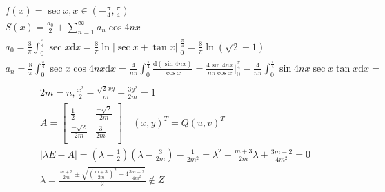 \documentclass{article}
\begin{document}
\begin{align*}
    f(x) = \sec x , x \in (-\frac{\pi}{4},\frac{\pi}{4}) \\
    S(x) = \frac{a_{0}}{2} + \sum_{n=1}^{\infty}a_{n}\cos 4nx \\
    a_{0} = \frac{8}{\pi}\int_{0}^{\frac{\pi}{4}} \sec x \mathrm{d}x = \frac{8}{\pi}\ln|\sec x + \tan x| |_{0}^{\frac{\pi}{4}} = \frac{8}{\pi}\ln(\sqrt{2}+1) \\ 
    a_{n} = \frac{8}{\pi}\int_{0}^{\frac{\pi}{4}} \sec x \cos 4nx \mathrm{d}x = \frac{4}{n\pi}\int_{0}^{\frac{\pi}{4}} \frac{\mathrm{d}(\sin 4nx)}{\cos x} = \frac{4\sin 4nx}{n\pi\cos x} |_{0}^{\frac{\pi}{4}} - \frac{4}{n\pi}\int_{0}^{\frac{\pi}{4}}\sin 4nx \sec x \tan x \mathrm{d}x  = \\
   \end{align*}
\begin{align*}
    2m = n , \frac{x^2}{2}-\frac{\sqrt{2}xy}{m}+\frac{3y^2}{2m} = 1 \\
    A = \left[
        \begin{array}{cc}
            \frac{1}{2} & \frac{-\sqrt{2}}{2m} \\
            \frac{-\sqrt{2}}{2m} & \frac{3}{2m} \\  
        \end{array}
    \right] \quad \left(x,y\right)^{T} = Q \left(u,v\right)^{T} \\ 
    |\lambda E - A| = (\lambda-\frac{1}{2})(\lambda-\frac{3}{2m})-\frac{1}{2m^2} = \lambda^2-\frac{m+3}{2m}\lambda+\frac{3m-2}{4m^2} = 0 \\
    \lambda = \frac{\frac{m+3}{2m} \pm \sqrt{\left(\frac{m+3}{2m}\right)^2-4\frac{3m-2}{4m^2}}}{2} \notin Z \\ 
\end{align*}
\end{document}
